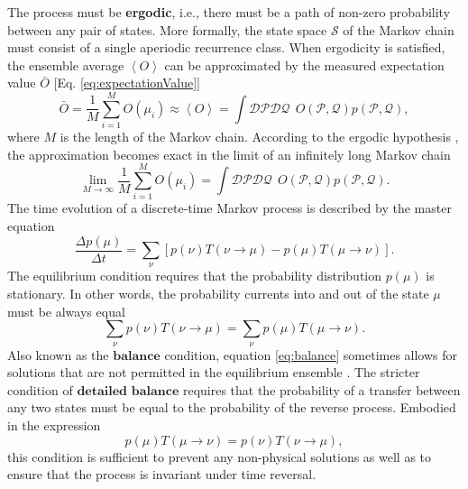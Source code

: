 \documentclass[12pt]{report}
\begin{document}
The process must be \textbf{ergodic}, i.e., there must be a path of non-zero probability between any pair of states. More formally, the state space $\mathcal{S}$ of the Markov chain must consist of a single aperiodic recurrence class. When ergodicity is satisfied, the ensemble average $\left\langle O \right\rangle$ can be approximated by the measured expectation value $\bar{O}$ [Eq. \ref{eq:expectationValue}] 
%
\begin{equation}
\label{eq:approximationOfExpectationValues}
\bar{O} = \frac{1}{M}\sum_{i = 1}^{M} O(\mu_{i}) \approx \left\langle O \right\rangle = \int \mathcal{DP}\mathcal{DQ} \:\: O(\mathcal{P},\mathcal{Q})
p(\mathcal{P},\mathcal{Q}),
\end{equation}
%
where $M$ is the length of the Markov chain. According to the ergodic hypothesis \cite{Tuckerman2010}, the approximation becomes exact in the limit of an infinitely long Markov chain
%
\begin{equation}
\label{eq:ergodicHyp}
\lim_{M\rightarrow \infty}\frac{1}{M}\sum_{i = 1}^{M} O(\mu_{i}) = \int \mathcal{DP}\mathcal{DQ} \:\: O(\mathcal{P},\mathcal{Q})
p(\mathcal{P},\mathcal{Q}).
\end{equation}
%
%
The time evolution of a discrete-time Markov process is described by the master equation
%
\begin{equation}
\label{eq:MasterEquation}
\frac{\Delta p(\mu)}{\Delta t} = \sum_{\nu}\left[ p(\nu)T\left(\nu \rightarrow \mu\right) - p(\mu)T\left(\mu \rightarrow \nu\right)\right].
\end{equation}
%
The equilibrium condition requires that the probability distribution $p(\mu)$ is stationary. In other words, the probability currents into and out of the state $\mu$ must be always equal
\begin{equation}
\label{eq:balance}
\sum_{\nu} p(\nu)T\left(\nu \rightarrow \mu\right) = \sum_{\nu} p(\mu)T\left(\mu \rightarrow \nu\right).
\end{equation}
%
Also known as the $\textbf{balance}$ condition, equation \ref{eq:balance} sometimes allows for solutions that are not permitted in the equilibrium ensemble \cite{Landau2000}. The stricter condition of $\textbf{detailed balance}$ requires that the probability of a transfer between any two states must be equal to the probability of the reverse process. Embodied in the expression
%
\begin{equation}
\label{eq:detailedBalance}
p(\mu)T\left(\mu \rightarrow \nu\right) = p(\nu)T\left(\nu \rightarrow \mu\right),
\end{equation} 
%
this condition is sufficient to prevent any non-physical solutions as well as to ensure that the process is invariant under time reversal.
\end{document}
